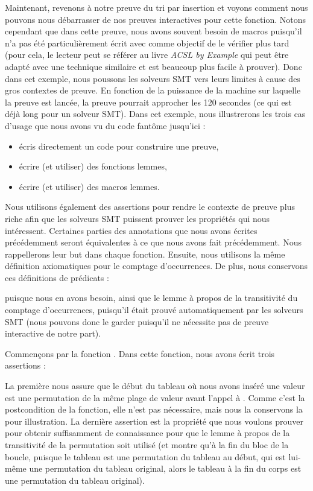 Maintenant, revenons à notre preuve du tri par insertion et voyons comment nous
pouvons nous débarrasser de nos preuves interactives pour cette fonction. Notons
cependant que dans cette preuve, nous avons souvent besoin de macros puisqu'il
n'a pas été particulièrement écrit avec comme objectif de le vérifier plus tard
(pour cela, le lecteur peut se référer au livre {\em ACSL by Example} qui peut être
adapté avec une technique similaire et est beaucoup plus facile à prouver). Donc
dans cet exemple, nous poussons les solveurs SMT vers leurs limites à cause des
gros contextes de preuve. En fonction de la puissance de la machine sur laquelle
la preuve est lancée, la preuve pourrait approcher les 120 secondes (ce qui est
déjà long pour un solveur SMT). Dans cet exemple, nous illustrerons les trois
cas d'usage que nous avons vu du code fantôme jusqu'ici :


\begin{itemize}
    \item écris directement un code pour construire une preuve,
    \item écrire (et utiliser) des fonctions lemmes,
    \item écrire (et utiliser) des macros lemmes.
\end{itemize}


Nous utilisons également des assertions pour rendre le contexte de preuve plus
riche afin que les solveurs SMT puissent prouver les propriétés qui nous intéressent.
Certaines parties des annotations que nous avons écrites précédemment seront
équivalentes à ce que nous avons fait précédemment. Nous rappellerons leur
but dans chaque fonction. Ensuite, nous utilisons la même définition axiomatiques
pour le comptage d'occurrences. De plus, nous conservons ces définitions de
prédicats :




puisque nous en avons besoin, ainsi que le lemme à propos de la transitivité du
comptage d'occurrences, puisqu'il était prouvé automatiquement par les solveurs
SMT (nous pouvons donc le garder puisqu'il ne nécessite pas de preuve interactive
de notre part).




Commençons par la fonction . Dans cette fonction,
nous avons écrit trois assertions :




La première nous assure que le début du tableau où nous avons inséré une valeur
est une permutation de la même plage de valeur avant l'appel à .
Comme c'est la postcondition de la fonction, elle n'est pas nécessaire, mais nous
la conservons la pour illustration. La dernière assertion est la propriété que
nous voulons prouver pour obtenir suffisamment de connaissance pour que le
lemme à propos de la transitivité de la permutation soit utilisé (et montre qu'à
la fin du bloc de la boucle, puisque le tableau est une permutation du tableau
au début, qui est lui-même une permutation du tableau original, alors le tableau
à la fin du corps est une permutation du tableau original).


